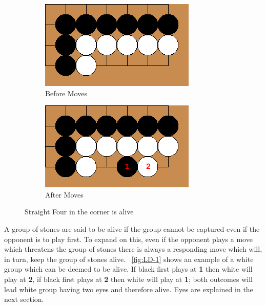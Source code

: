 \documentclass{l4proj}
\newcommand{\bo}[1]{\textbf{#1}}
\begin{document}
\begin{figure}[!ht]
\centering
\begin{subfigure}[b]{0.45\textwidth}
\includegraphics[width=\textwidth]{LD/1a.png}
\caption{Before Moves}
\label{fig:LD-1a}
\end{subfigure}\qquad
\begin{subfigure}[b]{0.45\textwidth}
\includegraphics[width=\textwidth]{LD/1b.png}
\caption{After Moves}
\label{fig:LD-1b}
\end{subfigure}
\caption{Straight Four in the corner is alive}
\label{fig:LD-1}
\end{figure}

A group of stones are said to be alive if the group cannot be captured even if the opponent is to play first. To expand on this, even if the opponent plays a move which threatens the group of stones there is always a responding move which will, in turn, keep the group of stones alive. ~\autoref{fig:LD-1} shows an example of a white group which can be deemed to be alive. If black first plays at \bo{1} then white will play at \bo{2}, if black first plays at \bo{2} then white will play at \bo{1}; both outcomes will lead white group having two eyes and therefore alive. Eyes are explained in the next section.
\end{document}
